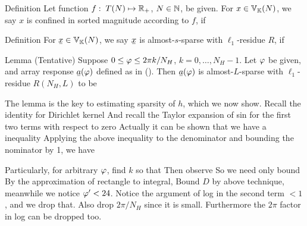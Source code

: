 \Result
{Definition}
{
Let function \(f:\; T (N) \mapsto \mathbb{R}_+\), \(N \in \mathbb{N}\), be given.
For \(x \in \mathbb{V}_{\mathbb{K}}(N)\), we say \(x\) is confined in sorted magnitude according to \(f\), if
}

\Result
{Definition}
{
For \(\V{x} \in \MB{V}_{\MB{K}}(N)\), we say \(\V{x}\) is almost-\(s\)-sparse with \(\ell_1\)-residue \(R\), if
}


\Result
{Lemma (Tentative)}
{
Suppose \(0 \leq \varphi \leq 2\pi k /N_H\), \(k =0, \dotsc, N_H-1\).
Let \(\varphi\) be given, and array response \(\V{a} (\f)\) defined as in ().
Then \(\V{a} (\f)\) is almost-\(L\)-sparse with \(\ell_1\)-residue \(R(N_H, L)\) to be
%
}

The lemma is the key to estimating sparsity of \(h\), which we now show.
Recall the identity for Dirichlet kernel
%
%
And recall the Taylor expansion of sin for the first two terms with respect to zero
%
%
Actually it can be shown that we have a inequality
%
%
Applying the above inequality to the denominator and bounding the nominator by 1, we have
%

Particularly, for arbitrary \(\varphi\), find \(k\) so that
%
Then observe
So we need only bound
By the approximation of rectangle to integral,
Bound \(D\) by above technique, meanwhile we notice \(\varphi' <24\).
Notice the argument of log in the second term \(<1\), and we drop that.
Also drop \(2\pi /N_H\) since it is small.
Furthermore the \(2\pi\) factor in log can be dropped too.


